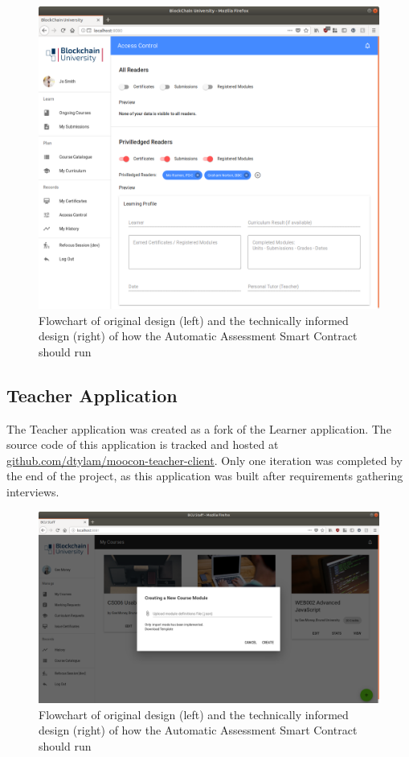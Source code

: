 \begin{figure}[!ht]
	\centering
	\includegraphics[width=1.0\textwidth]{Learner_AC}
	\caption[Learner Application Access Control Page]
	{Flowchart of original design (left) and the technically informed design (right) of how the Automatic Assessment Smart Contract should run}
	\label{fig:Learner_AC}
\end{figure}

\subsection{Teacher Application}

The Teacher application was created as a fork of the Learner application. 
The source code of this application is tracked and hosted at 
\href{https://github.com/dtylam/moocon-teacher-client}{\underline{github.com/dtylam/moocon-teacher-client}}.
Only one iteration was completed by the end of the project, as this application was built after requirements gathering interviews.

\begin{figure}[!ht]
	\centering
	\includegraphics[width=1.0\textwidth]{Teacher_createcourse}
	\caption[Teacher Application My Courses Page]
	{Flowchart of original design (left) and the technically informed design (right) of how the Automatic Assessment Smart Contract should run}
	\label{fig:Teacher_createcourse}
\end{figure}

